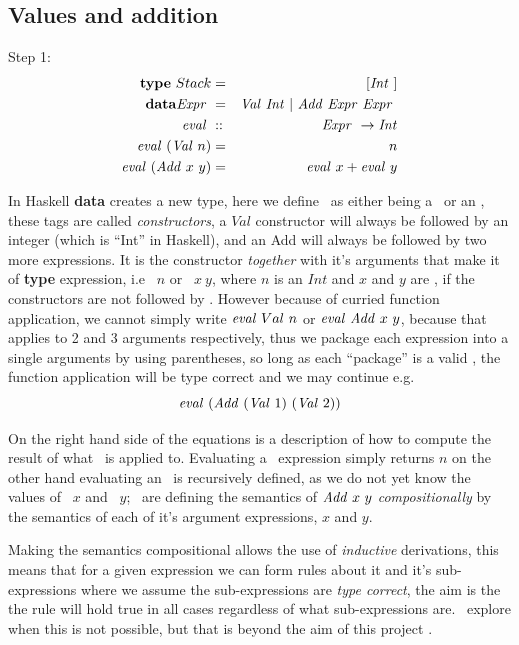 \documentclass {article}
\begin{document}
\subsection{Values and addition}
Step 1:
\begin{eqnarray}
\textbf{type} \ Stack &=& [\mathit{Int\ }] \nonumber \\
\textbf{data} \mathit{Expr\ } &=& \mathit{Val\ } \mathit{Int\ } | \ \mathit{Add\ } \mathit{Expr\ } \mathit{Expr\ } \nonumber \\
\mathit{eval\ } &::& \mathit{Expr\ } \rightarrow \mathit{Int} \nonumber \\ 
\mathit{eval\ } (\mathit{Val\ }  n) &=& n \label{evalval}\\
\mathit{eval\ } (\mathit{Add\ }  x\  y) &=& \mathit{eval\ }  x + \mathit{eval\ }  y \label{evaladd}
\end{eqnarray}

In Haskell \textbf{data} creates a new type,
here we define \expr\ as either being a \val\
or an \add, these tags are called \emph{constructors},
a $Val$ constructor will always be followed by an integer
(which is ``Int'' in Haskell),
and an Add will always be followed by two more expressions.
It is the constructor \emph{together} with 
it's arguments that make it of \textbf{type}
expression, i.e \val\ $n$ or \add\ $x\ y$,
where $n$ is an $Int$ and $x$ and $y$ are \expr,
if the constructors are not followed by .
However because of curried function application,
we cannot simply write 
$\mathit{eval\ }  Val\ n$ or $\mathit{eval\ }  \mathit{Add\ } x\ y$,
because that applies \eval to 2 and 3 arguments respectively,
thus we package each expression into a single arguments
by using parentheses, so long as each ``package'' is a
valid \expr, the function application will be type correct
and we may continue e.g.
\[ \mathit{eval\ } (\mathit{Add\ } (\mathit{Val\ } 1)\ (\mathit{Val\ } 2)) \]

On the right hand side of the equations is a
description of how to compute 
the result of what \eval\ is applied to.
Evaluating a \val\ expression simply returns $n$
on the other hand evaluating an \add\
is recursively defined, as we do not yet know
the values of \eval\ $x$ and  \eval\ $y$; \BH\ are defining the
semantics of $\Add x\ y$ \emph{compositionally} by the 
semantics of each of it's argument expressions, $x$ and $y$.

Making the semantics compositional allows
the use of \textit{inductive} derivations,
this means that for a given 
 expression we can form rules about it and it's
sub-expressions where 
we assume the sub-expressions are
\textit{type correct},
the aim is the the rule will hold true in
all cases regardless of what sub-expressions are.
\BH\ explore
when this is not possible, but that is beyond
the aim of this project \cite{bandh}.
\end{document}
